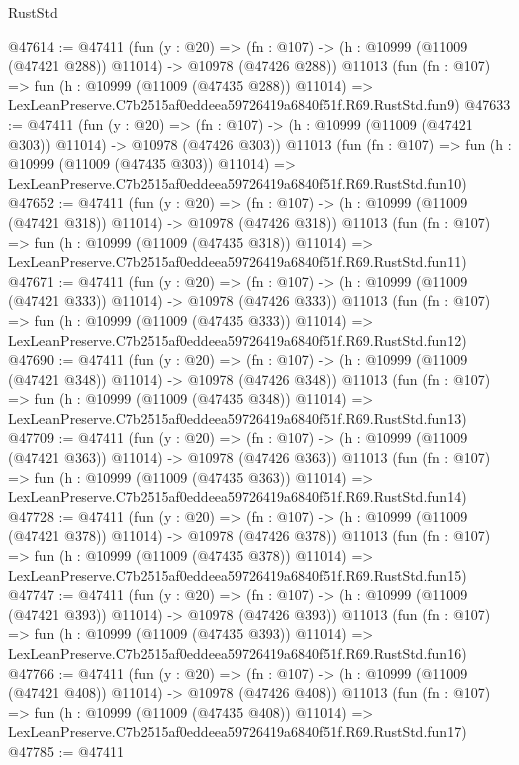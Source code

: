 \begin{lexlean}{RustStd}
\begin{coremodule}
@47614 := @47411
    (fun (y : @20) =>
    (fn : @107) -> (h : @10999 (@11009 (@47421 @288)) @11014) -> @10978 (@47426 @288))
    @11013
    (fun (fn : @107) =>
    fun (h : @10999 (@11009 (@47435 @288)) @11014) =>
    LexLeanPreserve.C7b2515af0eddeea59726419a6840f51f.R69.RustStd.fun9)
@47633 := @47411
    (fun (y : @20) =>
    (fn : @107) -> (h : @10999 (@11009 (@47421 @303)) @11014) -> @10978 (@47426 @303))
    @11013
    (fun (fn : @107) =>
    fun (h : @10999 (@11009 (@47435 @303)) @11014) =>
    LexLeanPreserve.C7b2515af0eddeea59726419a6840f51f.R69.RustStd.fun10)
@47652 := @47411
    (fun (y : @20) =>
    (fn : @107) -> (h : @10999 (@11009 (@47421 @318)) @11014) -> @10978 (@47426 @318))
    @11013
    (fun (fn : @107) =>
    fun (h : @10999 (@11009 (@47435 @318)) @11014) =>
    LexLeanPreserve.C7b2515af0eddeea59726419a6840f51f.R69.RustStd.fun11)
@47671 := @47411
    (fun (y : @20) =>
    (fn : @107) -> (h : @10999 (@11009 (@47421 @333)) @11014) -> @10978 (@47426 @333))
    @11013
    (fun (fn : @107) =>
    fun (h : @10999 (@11009 (@47435 @333)) @11014) =>
    LexLeanPreserve.C7b2515af0eddeea59726419a6840f51f.R69.RustStd.fun12)
@47690 := @47411
    (fun (y : @20) =>
    (fn : @107) -> (h : @10999 (@11009 (@47421 @348)) @11014) -> @10978 (@47426 @348))
    @11013
    (fun (fn : @107) =>
    fun (h : @10999 (@11009 (@47435 @348)) @11014) =>
    LexLeanPreserve.C7b2515af0eddeea59726419a6840f51f.R69.RustStd.fun13)
@47709 := @47411
    (fun (y : @20) =>
    (fn : @107) -> (h : @10999 (@11009 (@47421 @363)) @11014) -> @10978 (@47426 @363))
    @11013
    (fun (fn : @107) =>
    fun (h : @10999 (@11009 (@47435 @363)) @11014) =>
    LexLeanPreserve.C7b2515af0eddeea59726419a6840f51f.R69.RustStd.fun14)
@47728 := @47411
    (fun (y : @20) =>
    (fn : @107) -> (h : @10999 (@11009 (@47421 @378)) @11014) -> @10978 (@47426 @378))
    @11013
    (fun (fn : @107) =>
    fun (h : @10999 (@11009 (@47435 @378)) @11014) =>
    LexLeanPreserve.C7b2515af0eddeea59726419a6840f51f.R69.RustStd.fun15)
@47747 := @47411
    (fun (y : @20) =>
    (fn : @107) -> (h : @10999 (@11009 (@47421 @393)) @11014) -> @10978 (@47426 @393))
    @11013
    (fun (fn : @107) =>
    fun (h : @10999 (@11009 (@47435 @393)) @11014) =>
    LexLeanPreserve.C7b2515af0eddeea59726419a6840f51f.R69.RustStd.fun16)
@47766 := @47411
    (fun (y : @20) =>
    (fn : @107) -> (h : @10999 (@11009 (@47421 @408)) @11014) -> @10978 (@47426 @408))
    @11013
    (fun (fn : @107) =>
    fun (h : @10999 (@11009 (@47435 @408)) @11014) =>
    LexLeanPreserve.C7b2515af0eddeea59726419a6840f51f.R69.RustStd.fun17)
@47785 := @47411

\end{coremodule}
\end{lexlean}

